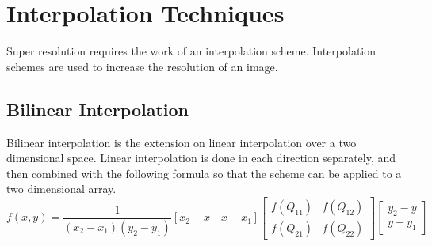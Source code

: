 \documentclass{article}
\begin{document}
\section{Interpolation Techniques}
\label{sec:interp-techs}
Super resolution requires the work of an interpolation
scheme. Interpolation schemes are used to increase the resolution of
an image.
\subsection{Bilinear Interpolation}
\label{subsec:bilinear}
Bilinear interpolation is the extension on linear interpolation over a
two dimensional space. Linear interpolation is done in each direction
separately, and then combined with the following formula so that the
scheme can be applied to a two dimensional array.
\[f(x, y) = \frac{1}{(x_2 - x_1)(y_2-y_1)} [x_2-x \quad x - x_1]
\begin{bmatrix} f(Q_{11}) & f(Q_{12}) \\ f(Q_{21}) & f(Q_{22}) \end{bmatrix} \begin{bmatrix} y_2 - y \\ y-y_1 \end{bmatrix}\]
\end{document}
